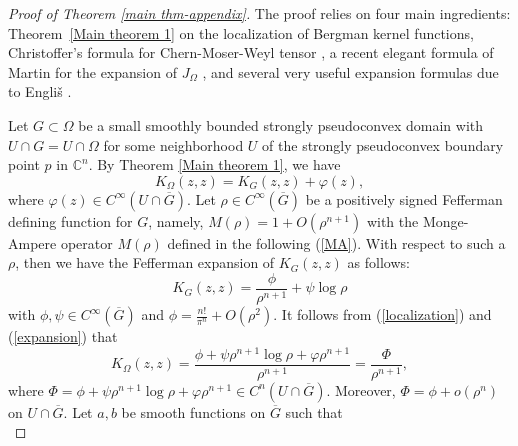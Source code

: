 \documentclass[a4paper,centertags,oneside,12pt]{amsart}
\numberwithin{equation}{section}
\begin{document}
\begin{proof}[Proof of Theorem \ref{main thm-appendix}]
The proof relies on four main ingredients: Theorem~\ref{Main theorem 1} on the localization of Bergman kernel functions, Christoffer's formula for Chern-Moser-Weyl tensor \cite{Ch81}, a recent elegant formula of Martin for the expansion of \(J_\Omega\) \cite{Ma21}, and several very useful  expansion formulas due to Engliš \cite{Eng08}.


Let $G\subset\Omega$ be a small smoothly bounded  strongly pseudoconvex domain with $U\cap G=U\cap \Omega$ for some neighborhood $U$ of the strongly pseudoconvex boundary point $p$ in $\mathbb C^n$. By Theorem \ref{Main theorem 1}, we have
\begin{equation}\label{localization}
    K_\Omega(z, z)=K_G(z, z)+\varphi(z),
\end{equation}
where $\varphi(z)\in C^\infty(U\cap\overline G)$. Let $\rho\in C^\infty(\overline G)$ be a positively signed Fefferman defining function for $G$, namely, $M(\rho)=1+O(\rho^{n+1})$ with the Monge-Ampere operator $M(\rho)$ defined in the following (\ref{MA}). With respect to such a $\rho$, then we have the Fefferman expansion of $K_G(z, z)$ as follows:
\begin{equation}\label{expansion}
    K_G(z, z)=\frac{\phi}{\rho^{n+1}}+\psi\log\rho
\end{equation}
with $\phi, \psi\in C^\infty(\overline G)$ and $\phi=\frac{n!}{\pi^n}+O(\rho^2)$. It follows from (\ref{localization}) and (\ref{expansion}) that 
\begin{equation}\label{AP}
    K_{\Omega}(z, z)=\frac{\phi+\psi\rho^{n+1}\log\rho+\varphi\rho^{n+1}}{\rho^{n+1}}=\frac{\Phi}{\rho^{n+1}},
\end{equation}
where $\Phi=\phi+\psi\rho^{n+1}\log\rho+\varphi\rho^{n+1}\in C^n(U\cap\overline G)$. Moreover, $\Phi=\phi+o(\rho^n)$ on $U\cap\overline G$.
Let $a, b$ be smooth functions on $\overline G$ such that 
\begin{equation*}

\end{equation*}
\end{proof}
\end{document}
